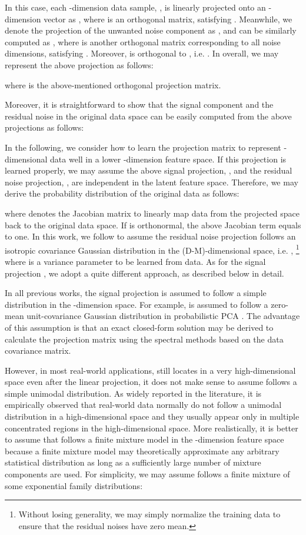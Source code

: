 \documentclass[11pt]{article}
\begin{document}
In this case, each -dimension data  sample, , is linearly projected onto an -dimension vector  as 
,  where  is an orthogonal matrix, satisfying . Meanwhile, 
we denote the projection of the unwanted noise component  as , and  
 can be similarly computed as , where  is another orthogonal matrix corresponding to all noise dimensions, satisfying . Moreover,  is orthogonal to  , i.e.
. 
In overall, we may represent the above projection as follows:


where  is the above-mentioned  orthogonal projection matrix. 

Moreover, it is straightforward to show that the signal component  and the residual noise  in the original data space can be easily computed from the above projections as follows:





In the following, we consider how to learn the projection matrix  to 
represent -dimensional data well in a lower -dimension feature space.
If this projection is learned properly, we may assume 
the above signal projection, , and the residual noise projection, , are independent in the latent feature space. Therefore, we may derive the probability distribution of the original data as follows:

where  denotes the Jacobian matrix to linearly map data from the projected space back to the original data space. If  is orthonormal, the above Jacobian term equals to one. 
In this work, 
we follow \cite{Tipping99b} to assume the residual noise projection  follows an isotropic covariance Gaussian distribution in the (D-M)-dimensional space, i.e. ,
\footnote{Without losing generality, we may simply normalize the training data to ensure that the residual noises have zero mean.} where  is a variance parameter to be learned from data. As for the signal projection , we adopt a quite different approach, as described below in detail.

In all previous works, the signal projection  is assumed to follow a simple distribution in the -dimension space. For example,  is assumed to follow a zero-mean unit-covariance Gaussian distribution in probabilistic PCA \cite{Tipping99b,Roweis98}. 
The advantage of this assumption is that an exact closed-form solution may be derived to calculate the projection matrix  using the spectral methods based on the data covariance matrix.  

However, in most real-world applications,  still locates in a very high-dimensional space even after the linear projection, it does not make sense to assume  follows a simple unimodal distribution. As widely reported in the literature, it is empirically observed that real-world  data normally do not follow a unimodal distribution in a high-dimensional space and they usually appear only in multiple concentrated regions in the high-dimensional space. More realistically, it is better to assume that  follows a finite mixture model in the -dimension feature space
because a finite mixture model may theoretically approximate any arbitrary statistical distribution as long as a sufficiently large number of mixture components are used. For simplicity, we may assume  follows a finite mixture of some exponential family distributions:
\end{document}
